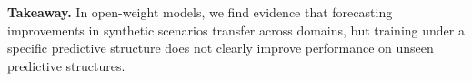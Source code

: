\documentclass{article}
\begin{document}



\noindent\textbf{Takeaway.}
In open-weight models, we find evidence that forecasting improvements in synthetic scenarios transfer across domains, but training under a specific predictive structure does not clearly improve performance on unseen predictive structures.

\end{document}
